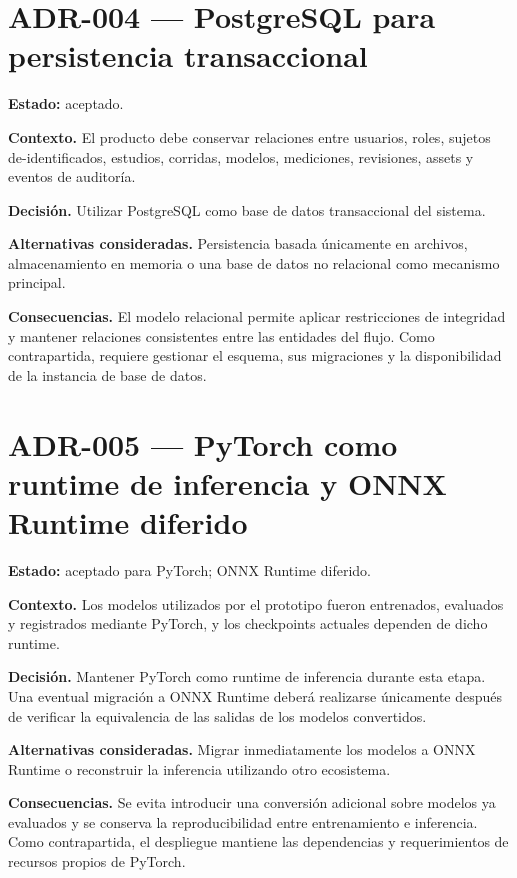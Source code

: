 \section*{ADR-004 --- PostgreSQL para persistencia transaccional}
{}
\label{adr:004-postgresql-persistencia}

\textbf{Estado:} aceptado.

\textbf{Contexto.} El producto debe conservar relaciones entre usuarios, roles, sujetos de-identificados, estudios, corridas, modelos, mediciones, revisiones, assets y eventos de auditoría.

\textbf{Decisión.} Utilizar PostgreSQL como base de datos transaccional del sistema.

\textbf{Alternativas consideradas.} Persistencia basada únicamente en archivos, almacenamiento en memoria o una base de datos no relacional como mecanismo principal.

\textbf{Consecuencias.} El modelo relacional permite aplicar restricciones de integridad y mantener relaciones consistentes entre las entidades del flujo. Como contrapartida, requiere gestionar el esquema, sus migraciones y la disponibilidad de la instancia de base de datos.

\section*{ADR-005 --- PyTorch como runtime de inferencia y ONNX Runtime diferido}
{}
\label{adr:005-pytorch-onnx-runtime}

\textbf{Estado:} aceptado para PyTorch; ONNX Runtime diferido.

\textbf{Contexto.} Los modelos utilizados por el prototipo fueron entrenados, evaluados y registrados mediante PyTorch, y los checkpoints actuales dependen de dicho runtime.

\textbf{Decisión.} Mantener PyTorch como runtime de inferencia durante esta etapa. Una eventual migración a ONNX Runtime deberá realizarse únicamente después de verificar la equivalencia de las salidas de los modelos convertidos.

\textbf{Alternativas consideradas.} Migrar inmediatamente los modelos a ONNX Runtime o reconstruir la inferencia utilizando otro ecosistema.

\textbf{Consecuencias.} Se evita introducir una conversión adicional sobre modelos ya evaluados y se conserva la reproducibilidad entre entrenamiento e inferencia. Como contrapartida, el despliegue mantiene las dependencias y requerimientos de recursos propios de PyTorch.


